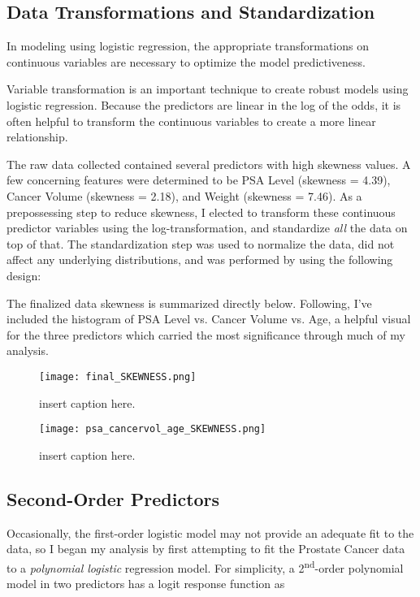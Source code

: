 \subsection{Data Transformations and Standardization}
In modeling using logistic regression, the appropriate transformations on continuous variables are necessary to optimize the model predictiveness. \par
Variable transformation is an important technique to create robust models using logistic regression. Because the predictors are linear in the log of the odds, it is often helpful to transform the continuous variables to create a more linear relationship. \par
The raw data collected contained several predictors with high skewness values.
A few concerning features were determined to be PSA Level (skewness = 4.39), Cancer Volume (skewness = 2.18), and Weight (skewness = 7.46). As a prepossessing step to reduce skewness, I elected to transform these continuous predictor variables using the log-transformation, and standardize \textit{all} the data on top of that. The standardization step was used to normalize the data, did not affect any underlying distributions, and was performed by using the following design: \par 

The finalized data skewness is summarized directly below. Following, I've included the histogram of PSA Level vs. Cancer Volume vs. Age, a helpful visual for the three predictors which carried the most significance through much of my analysis.


\begin{figure}[H]
	\centering
	\texttt{[image: final\_SKEWNESS.png]}
	\caption{insert caption here.}
\end{figure}


\begin{figure}[H]
	\centering
	\texttt{[image: psa\_cancervol\_age\_SKEWNESS.png]}
	\caption{insert caption here.}
\end{figure}

\subsection{Second-Order Predictors}
Occasionally, the first-order logistic model may not provide an adequate fit to the data, so I began my analysis by first attempting to fit the Prostate Cancer data to a \textit{polynomial logistic} regression model. For simplicity, a 2\textsuperscript{nd}-order polynomial model in two predictors has a logit response function as

